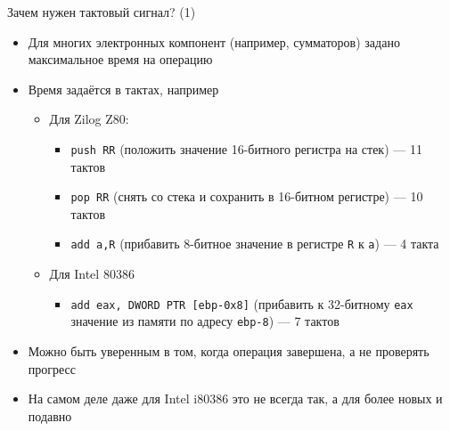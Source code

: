 \documentclass[xetex,aspectratio=43]{beamer}
\begin{document}
\begin{frame}[fragile]{Зачем нужен тактовый сигнал? (1)}
    \begin{itemize}
        \tightlist
        \item
        Для многих электронных компонент (например, сумматоров) задано
        максимальное время на операцию
        \item
        Время задаётся в тактах, например

        \begin{itemize}
            \tightlist
            \item
            Для Zilog Z80:

            \begin{itemize}
                \tightlist
                \item
                \texttt{push RR} (положить значение 16-битного регистра на стек)
                --- 11 тактов
                \item
                \texttt{pop RR} (снять со стека и сохранить в 16-битном регистре)
                --- 10 тактов
                \item
                \texttt{add a,R} (прибавить 8-битное значение в регистре
                \texttt{R} к \texttt{a}) --- 4 такта
            \end{itemize}
            \item
            Для Intel 80386

            \begin{itemize}
                \tightlist
                \item
                \texttt{add eax, DWORD PTR [ebp-0x8]} (прибавить к
                32-битному \texttt{eax} значение из памяти по адресу
                \texttt{ebp-8}) --- 7 тактов
            \end{itemize}
        \end{itemize}
        \item
        Можно быть уверенным в том, когда операция завершена, а не проверять
        прогресс
    \end{itemize}

    \pause

    \begin{itemize}
        \tightlist
        \item
        На самом деле даже для Intel i80386 это не всегда так, а для более
        новых и подавно
    \end{itemize}
\end{frame}
\end{document}
